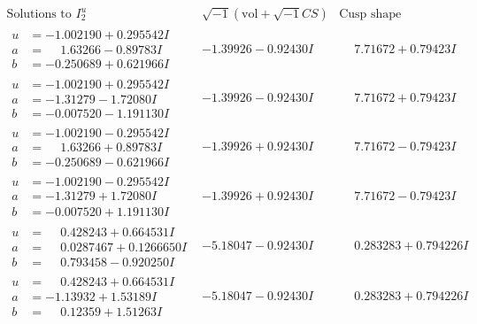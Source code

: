 \documentclass[1p]{elsarticle_modified}
\theoremstyle{definition}
\newcommand{\I}{\sqrt{-1}}
\begin{document}
$$\begin{array}{c|c|c}  
\text{Solutions to }I^u_{2}& \I (\text{vol} + \sqrt{-1}CS) & \text{Cusp shape}\\
 \hline 
\begin{aligned}
u &= -1.002190 + 0.295542 I \\
a &= \phantom{-}1.63266 - 0.89783 I \\
b &= -0.250689 + 0.621966 I\end{aligned}
 & -1.39926 - 0.92430 I & \phantom{-}7.71672 + 0.79423 I \\ \hline\begin{aligned}
u &= -1.002190 + 0.295542 I \\
a &= -1.31279 - 1.72080 I \\
b &= -0.007520 - 1.191130 I\end{aligned}
 & -1.39926 - 0.92430 I & \phantom{-}7.71672 + 0.79423 I \\ \hline\begin{aligned}
u &= -1.002190 - 0.295542 I \\
a &= \phantom{-}1.63266 + 0.89783 I \\
b &= -0.250689 - 0.621966 I\end{aligned}
 & -1.39926 + 0.92430 I & \phantom{-}7.71672 - 0.79423 I \\ \hline\begin{aligned}
u &= -1.002190 - 0.295542 I \\
a &= -1.31279 + 1.72080 I \\
b &= -0.007520 + 1.191130 I\end{aligned}
 & -1.39926 + 0.92430 I & \phantom{-}7.71672 - 0.79423 I \\ \hline\begin{aligned}
u &= \phantom{-}0.428243 + 0.664531 I \\
a &= \phantom{-}0.0287467 + 0.1266650 I \\
b &= \phantom{-}0.793458 - 0.920250 I\end{aligned}
 & -5.18047 - 0.92430 I & \phantom{-}0.283283 + 0.794226 I \\ \hline\begin{aligned}
u &= \phantom{-}0.428243 + 0.664531 I \\
a &= -1.13932 + 1.53189 I \\
b &= \phantom{-}0.12359 + 1.51263 I\end{aligned}
 & -5.18047 - 0.92430 I & \phantom{-}0.283283 + 0.794226 I \\ \hline\begin{aligned}

\end{aligned}
\end{array}$$
\end{document}
